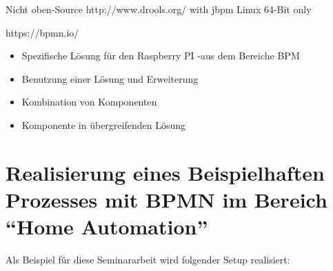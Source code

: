 \begin{itemize}
 Nicht oben-Source
 {}http://www.drools.org/ with jbpm
 Linux 64-Bit only

\end{itemize}

https://bpmn.io/


\begin{itemize}
\item Spezifische Lösung für den Raspberry PI -aus dem Bereiche BPM
\item Benutzung einer Lösung und Erweiterung
\item Kombination von Komponenten
\item Komponente in übergreifenden Lösung
\end{itemize}


\section{Realisierung eines Beispielhaften Prozesses mit BPMN im Bereich "`Home Automation"'}
Als Beispiel für diese Seminararbeit wird folgender Setup realisiert:


